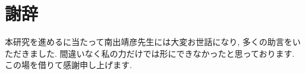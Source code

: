 \documentclass[uplatex,dvipdfmx,a4j]{jsreport}
\begin{document}
  \chapter{謝辞}  \label{chap:acknoledgement}

  本研究を進めるに当たって南出靖彦先生には大変お世話になり, 多くの助言をいただきました.
  間違いなく私の力だけでは形にできなかったと思っております.
  この場を借りて感謝申し上げます.
\end{document}
